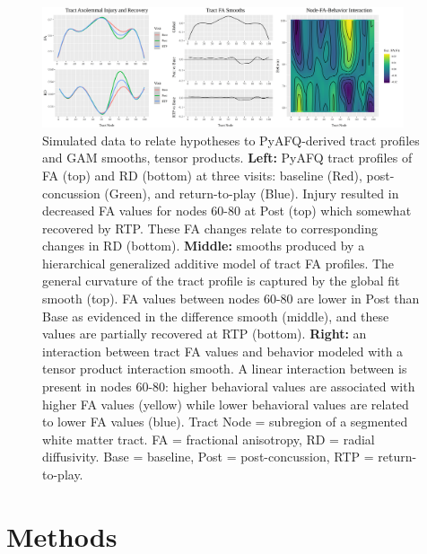 \documentclass[12pt]{article}
\begin{document}
\begin{figure}[H]
	\centering
	\includegraphics[width=0.95\textwidth]{fig_hypotheses.png}
	\caption{Simulated data to relate hypotheses to PyAFQ-derived tract profiles and GAM smooths, tensor products. \textbf{Left:} PyAFQ tract profiles of FA (top) and RD (bottom) at three visits: baseline (Red), post-concussion (Green), and return-to-play (Blue). Injury resulted in decreased FA values for nodes 60-80 at Post (top) which somewhat recovered by RTP. These FA changes relate to corresponding changes in RD (bottom). \textbf{Middle:} smooths produced by a hierarchical generalized additive model of tract FA profiles. The general curvature of the tract profile is captured by the global fit smooth (top). FA values between nodes 60-80 are lower in Post than Base as evidenced in the difference smooth (middle), and these values are partially recovered at RTP (bottom). \textbf{Right:} an interaction between tract FA values and behavior modeled with a tensor product interaction smooth. A linear interaction between is present in nodes 60-80: higher behavioral values are associated with higher FA values (yellow) while lower behavioral values are related to lower FA values (blue). Tract Node = subregion of a segmented white matter tract. FA = fractional anisotropy, RD = radial diffusivity. Base = baseline, Post = post-concussion, RTP = return-to-play.}
	\label{fig:intro-hyp}
\end{figure}


\section{Methods}
\label{sec:meth}
\end{document}
